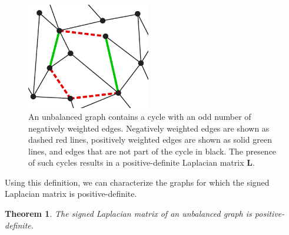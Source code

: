 \documentclass[11pt,a4paper]{book}
\newtheorem{theorem}{Theorem}
\newcommand{\wTwo}{0.48}
\begin{document}
\begin{figure}[h!]
  \centering
  \includegraphics[width=\wTwo\textwidth]{img-svg/conflict}
  \caption{
    An unbalanced graph contains 
    a cycle with an odd number of negatively weighted edges.  Negatively
    weighted edges are shown as dashed red lines, positively weighted
    edges are shown 
    as solid green lines, and edges that are not part of the cycle in black. 
    The presence of such cycles results in a positive-definite
    Laplacian matrix $\mathbf L$. 
  }
  \label{fig:conflict}
\end{figure}

Using this definition, we can characterize the graphs for which the
signed Laplacian matrix is positive-definite.
\begin{theorem}
  \label{theo:one}
  The signed Laplacian matrix of an unbalanced graph is positive-definite.   
\end{theorem}
\end{document}
